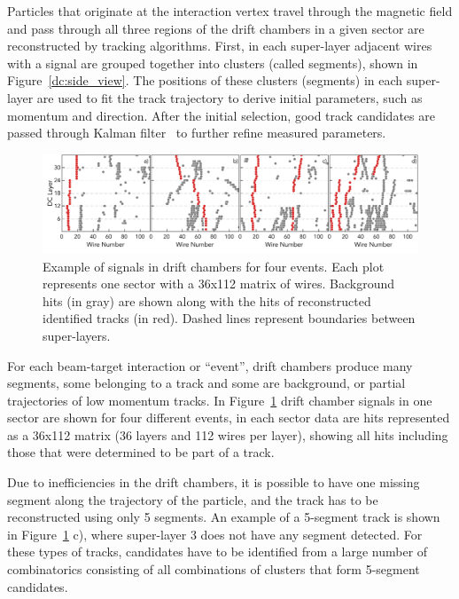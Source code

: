 \documentclass[aps,prl,preprint,12pt]{revtex4}
\begin{document}
Particles that originate at the interaction vertex travel through the magnetic field and pass through all 
three regions of the drift chambers in a given sector are reconstructed by tracking algorithms. First, 
in each super-layer adjacent wires with a signal are grouped together into clusters (called segments), 
shown in Figure~\ref{dc:side_view}. The positions of these clusters (segments) in each super-layer 
are used to fit the track trajectory to derive initial parameters, such as momentum and direction. 
After the initial selection, good track candidates are passed through Kalman filter~\cite{Kalman1960} 
 to further refine measured parameters.

\begin{figure}[!ht]
\begin{center}
 \includegraphics[width=6.2in]{images/figure_dc_examples.pdf}
\caption {Example of signals in drift chambers for four events. Each plot represents one sector with a 
36x112 matrix of wires. Background hits (in gray) are shown along with the hits of reconstructed 
identified tracks (in red). Dashed lines represent boundaries between super-layers.}
 \label{dc:events_sector}
 \end{center}
\end{figure}

For each beam-target interaction or ``event'', drift chambers produce many segments, some belonging 
to a track and some are background, or partial trajectories of low momentum tracks. In Figure~\ref{dc:events_sector} 
drift chamber signals in one sector are shown for four different  events, in each sector data are hits 
represented as a 36x112 matrix (36 layers and 112 wires per layer), showing all hits including those that 
were determined to be part of a track. 

Due to inefficiencies in the drift chambers, it is possible to have one missing segment along the trajectory 
of the particle, and the track has to be reconstructed using only 5 segments. An example of a 5-segment 
track is shown in Figure~\ref{dc:events_sector} c), where super-layer 3 does not have any segment detected. 
For these types of tracks, candidates have to be identified from a large number of combinatorics consisting 
of all combinations of clusters that form 5-segment candidates. 
\end{document}
